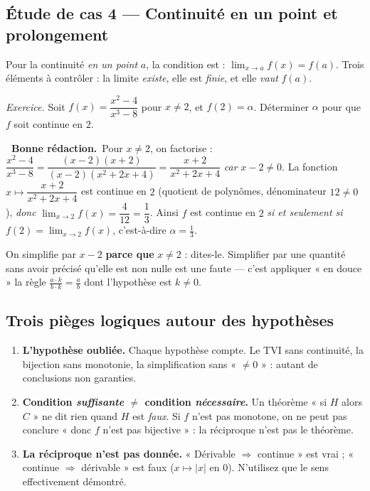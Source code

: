 \documentclass[11pt,a4paper]{article}
\newcommand{\ok}{\textcolor{METeal}{\textbf{\ding{51}\ \sffamily Bonne rédaction.}}\ }
\begin{document}
\subsection{Étude de cas 4 — Continuité en un point et prolongement}

Pour la continuité \emph{en un point} $a$, la condition est :
$\displaystyle\lim_{x\to a}f(x)=f(a)$. Trois éléments à contrôler : la limite \emph{existe},
elle est \emph{finie}, et elle \emph{vaut} $f(a)$.

\emph{Exercice.} Soit $f(x)=\dfrac{x^2-4}{x^3-8}$ pour $x\ne2$, et $f(2)=\alpha$. Déterminer
$\alpha$ pour que $f$ soit continue en $2$.
\begin{bonne}
\ok Pour $x\ne2$, on factorise :
$\dfrac{x^2-4}{x^3-8}=\dfrac{(x-2)(x+2)}{(x-2)(x^2+2x+4)}=\dfrac{x+2}{x^2+2x+4}$
\emph{car} $x-2\ne0$. La fonction $x\mapsto\dfrac{x+2}{x^2+2x+4}$ est continue en $2$ (quotient
de polynômes, dénominateur $12\ne0$), \emph{donc}
$\displaystyle\lim_{x\to2}f(x)=\dfrac{4}{12}=\dfrac13$. Ainsi $f$ est continue en $2$
\emph{si et seulement si} $f(2)=\lim_{x\to2}f(x)$, c'est-à-dire
$\boxed{\alpha=\tfrac13}$.
\end{bonne}

\begin{attention}
On simplifie par $x-2$ \textbf{parce que} $x\ne2$ : dites-le. Simplifier par une quantité
sans avoir précisé qu'elle est non nulle est une faute — c'est appliquer « en douce » la
règle $\frac{a\cdot k}{b\cdot k}=\frac ab$ dont l'hypothèse est $k\ne0$.
\end{attention}

\subsection{Trois pièges logiques autour des hypothèses}

\begin{enumerate}
  \item \textbf{L'hypothèse oubliée.} Chaque hypothèse compte. Le TVI sans continuité, la
  bijection sans monotonie, la simplification sans « $\ne 0$ » : autant de conclusions non
  garanties.
  \item \textbf{Condition \emph{suffisante} $\ne$ condition \emph{nécessaire}.} Un théorème
  « si $H$ alors $C$ » ne dit rien quand $H$ est \emph{faux}. Si $f$ n'est pas monotone, on ne
  peut pas conclure « donc $f$ n'est pas bijective » : la réciproque n'est pas le théorème.
  \item \textbf{La réciproque n'est pas donnée.} « Dérivable $\Rightarrow$ continue » est vrai ;
  « continue $\Rightarrow$ dérivable » est faux ($x\mapsto|x|$ en $0$). N'utilisez que le sens
  effectivement démontré.
\end{enumerate}
\end{document}

